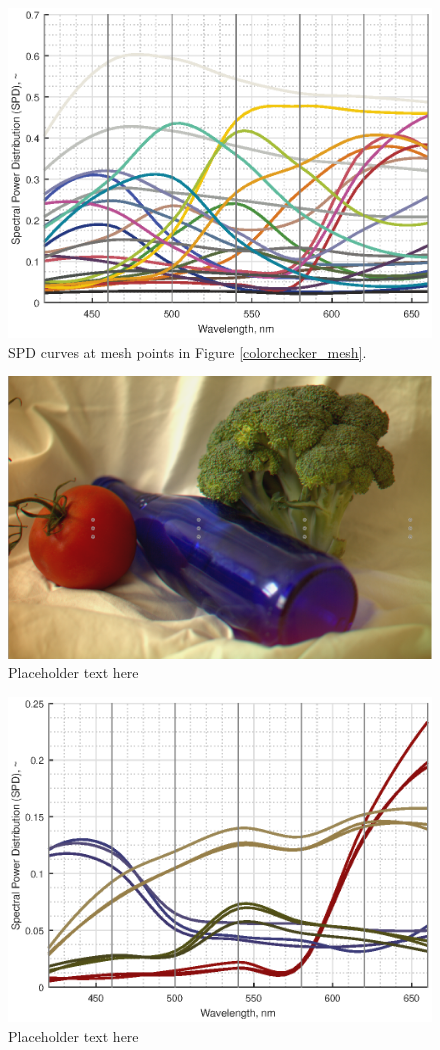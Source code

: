 \documentclass[twocolumn,10pt]{asme2ej}
\begin{document}
\begin{figure}[H]
\begin{centering}
  \includegraphics[height=0.6\linewidth]{colorchecker_SPDs.eps}
  \caption{SPD curves at mesh points in Figure \ref{colorchecker_mesh}.}
  \label{colorchecker_SPDs}
    \end{centering}
\end{figure}

\clearpage


\begin{figure}[H]
\begin{centering}
  \includegraphics[height=0.45\linewidth]{tomato_bottle_broccoli_mesh.png}
  \caption{Placeholder text here}
  \label{tomato_mesh}
  \end{centering}
\end{figure}

\begin{figure}[H]
\begin{centering}
  \includegraphics[height=0.6\linewidth]{tomato_bottle_broccoli_SPDs.eps}
  \caption{Placeholder text here}
  \label{tomato_SPDs}
  \end{centering}
\end{figure}
\end{document}
